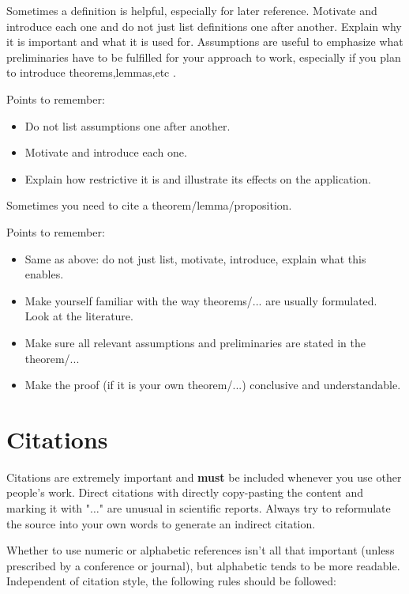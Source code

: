 Sometimes a definition is helpful, especially for later reference. Motivate and introduce each one and do not just list definitions one after another. Explain why it is important and what it is used for. Assumptions are useful to emphasize what preliminaries have to be fulfilled for your approach to work, especially if you plan to introduce theorems,lemmas,etc .

Points to remember:
\begin{itemize}
	\item Do not list assumptions one after another.
	\item Motivate and introduce each one.
	\item Explain how restrictive it is and illustrate its effects on the application.
\end{itemize}

Sometimes you need to cite a theorem/lemma/proposition.

Points to remember:
\begin{itemize}
	\item Same as above: do not just list, motivate, introduce, explain what this enables.
	\item Make yourself familiar with the way theorems/... are usually formulated. Look at the literature.
	\item Make sure all relevant assumptions and preliminaries are stated in the theorem/...
	\item Make the proof (if it is your own theorem/...) conclusive and understandable.
\end{itemize}



\section{Citations}

Citations are extremely important and \textbf{must} be included whenever you use other people's work. Direct citations with directly copy-pasting the content and marking it with "$\ldots$" are unusual in scientific reports. Always try to reformulate the source into your own words to generate an indirect citation.


Whether to use numeric or alphabetic references isn't all that important (unless prescribed by a conference or journal), but alphabetic tends to be more readable. Independent of citation style, the following rules should be followed:

